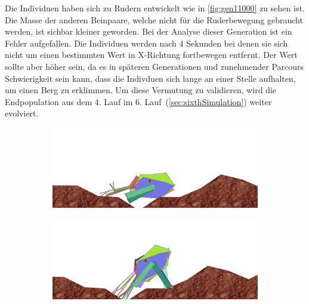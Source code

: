           Die Individuen haben sich zu Rudern entwickelt wie in \vref{fig:gen11000} zu sehen ist.
          Die Masse der anderen Beinpaare, welche nicht für die Ruderbewegung gebraucht werden, ist sichbar kleiner geworden.
          Bei der Analyse dieser Generation ist ein Fehler aufgefallen. Die Individuen werden nach 4 Sekunden bei denen sie sich nicht um einen bestimmten Wert in X-Richtung fortbewegen entfernt.
          Der Wert sollte aber höher sein, da es in späteren Generationen und zunehmender Parcours Schwierigkeit sein kann, dass die Indivduen sich lange an einer Stelle aufhalten, um einen Berg zu erklimmen.
          Um diese Vermutung zu validieren, wird die Endpopulation aus dem 4. Lauf im 6. Lauf~(\vref{sec:sixthSimulation}) weiter evolviert.
          \begin{figure}[H]
            \centering
            \begin{subfigure}[b]{0.45\textwidth}
              \includegraphics[width=\linewidth,center]{graphics/simulation-results/4_gen11000_1}
              \caption{\label{fig:gen11000_1}}
            \end{subfigure}
            \begin{subfigure}[b]{0.45\textwidth}
              \includegraphics[width=\linewidth,center]{graphics/simulation-results/4_gen11000_2}
              \caption{\label{fig:gen11000_2}}
            \end{subfigure}
            \begin{subfigure}[b]{0.45\textwidth}

\end{subfigure}
\end{figure}
